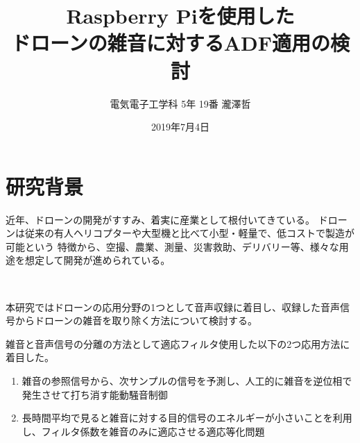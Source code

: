\documentclass[a4paper]{ltjsarticle}
\title{Raspberry Piを使用した\\ドローンの雑音に対するADF適用の検討}
\author{電気電子工学科 5年 19番 瀧澤哲}
\date{2019年7月4日}
\begin{document}
%

\maketitle
  
\section{研究背景}

  近年、ドローンの開発がすすみ、着実に産業として根付いてきている。%
  ドローンは従来の有人ヘリコプターや大型機と比べて小型・軽量で、低コストで製造が可能という%
  特徴から、空撮、農業、測量、災害救助、デリバリー等、様々な用途を想定して開発が進められている。

  

  本研究ではドローンの応用分野の1つとして音声収録に着目し、収録した音声信号からドローンの雑音を取り除く方法について検討する。




  
  雑音と音声信号の分離の方法として適応フィルタ使用した以下の2つ応用方法に着目した。
\begin{enumerate}
  \renewcommand{\labelenumi}{(\arabic{enumi})}
  \item 雑音の参照信号から、次サンプルの信号を予測し、人工的に雑音を逆位相で発生させて打ち消す能動騒音制御
  \item 長時間平均で見ると雑音に対する目的信号のエネルギーが小さいことを利用し、フィルタ係数を雑音のみに適応させる適応等化問題
\end{enumerate}  
\end{document}
